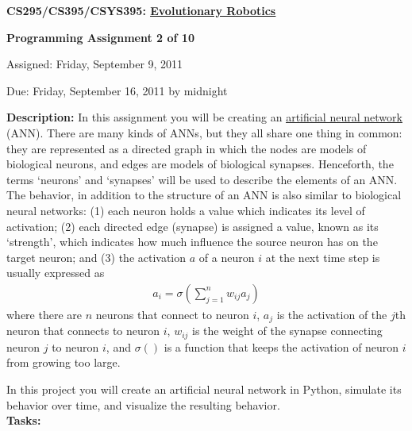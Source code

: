 \documentclass[12pt]{article}
\begin{document}
\centerline{\bf \Large CS295/CS395/CSYS395: \href{CS295_395_Syllabus.pdf}{\underline{Evolutionary Robotics}}}

\vspace{0.5cm}

\centerline{\bf \large Programming Assignment 2 of 10}

\vspace{0.5cm}

\centerline{\large Assigned: Friday, September 9, 2011}

\vspace{0.5cm}

\centerline{\large Due: Friday, September 16, 2011 by midnight}

\vspace{0.5cm}

\noindent \textbf{Description:} In this assignment you will be creating an \href{http://en.wikipedia.org/wiki/Artificial_neural_network}{\underline{artificial neural network}} (ANN). There are many kinds of ANNs, but they all share one thing in common: they are represented as a directed graph in which the nodes are models of biological neurons, and edges are models of biological synapses. Henceforth, the terms `neurons' and `synapses' will be used to describe the elements of an ANN. The behavior, in addition to the structure of an ANN is also similar to biological neural networks:
(1) each neuron holds a value which indicates its level of activation;
(2) each directed edge (synapse) is assigned a value, known as its `strength', which indicates how much influence the source neuron has on the target neuron; and
(3)  the activation $a$ of a neuron $i$ at the next time step is usually expressed as
\begin{eqnarray}
a_i = \sigma ( \sum_{j=1}^{n} w_{ij}a_j )
\end{eqnarray}
where there are $n$ neurons that connect to neuron $i$,
$a_j$ is the activation of the $j$th neuron that connects to neuron $i$,
$w_{ij}$ is the weight of the synapse connecting neuron $j$ to neuron $i$,
and $\sigma()$ is a function that keeps the activation of neuron $i$ from growing too large.

In this project you will create an artificial neural network in Python, simulate its behavior over time, and visualize the resulting behavior. \\

\noindent \textbf{Tasks:}
\end{document}
